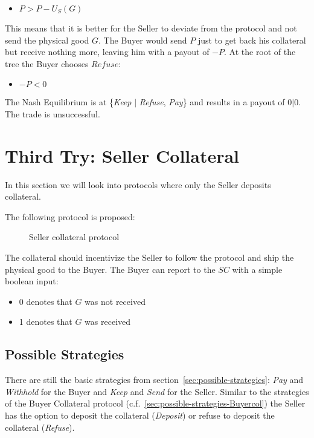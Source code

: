 \documentclass{cacthesis}
\begin{document}
\begin{itemize}
    \item $P > P-U_S(G)$
\end{itemize}
This means that it is better for the Seller to deviate from the protocol and not send the physical good $G$. The Buyer would send $P$ just to get back his collateral but receive nothing more, leaving him with a payout of $-P$. At the root of the tree the Buyer chooses $Refuse$:
\begin{itemize}
    \item $-P < 0$
\end{itemize}
The Nash Equilibrium is at \{\emph{Keep} $|$ \emph{Refuse}, \emph{Pay}\} and results in a payout of $0|0$. The trade is unsuccessful. \newpage


\section{Third Try: Seller Collateral}
\label{sec:Seller-col}
In this section we will look into protocols where only the Seller deposits collateral.\newline

The following protocol is proposed:
\begin{figure}[htb!]
\label{pro:Seller-col}
    \centering
    \caption{Seller collateral protocol}
\end{figure}

The collateral should incentivize the Seller to follow the protocol and ship the
physical good to the Buyer. The Buyer can report to the $SC$ with a simple boolean input:
\begin{itemize}
    \item 0 denotes that $G$ was not received
    \item 1 denotes that $G$ was received
\end{itemize}
\subsection{Possible Strategies}
\label{sec:possible-strategies-Sellercol}
There are still the basic strategies from section~\ref{sec:possible-strategies}: \emph{Pay} and \emph{Withhold} for the Buyer and \emph{Keep} and \emph{Send} for the Seller. Similar to the strategies of the Buyer Collateral protocol (c.f.~\ref{sec:possible-strategies-Buyercol}) the Seller has the option to deposit the collateral (\emph{Deposit}) or refuse to deposit the collateral (\emph{Refuse}).\newline
\end{document}
